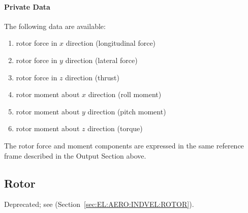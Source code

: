 \paragraph{Private Data}
The following data are available:
\begin{enumerate}
\item {} rotor force in $x$ direction (longitudinal force)
\item {} rotor force in $y$ direction (lateral force)
\item {} rotor force in $z$ direction (thrust)
\item {} rotor moment about $x$ direction (roll moment)
\item {} rotor moment about $y$ direction (pitch moment)
\item {} rotor moment about $z$ direction (torque)
\end{enumerate}
The rotor force and moment components are expressed in the same reference
frame described in the Output Section above.



\subsection{Rotor}
\label{sec:EL:AERO:ROTOR}
Deprecated; see  (Section~\ref{sec:EL:AERO:INDVEL:ROTOR}).

